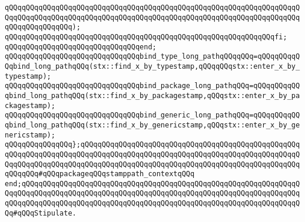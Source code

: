 \verb|qQQqqQQqqQQqqQQqqQQqqQQqqQQqqQQqqQQqqQQqqQQqqQQqqQQqqQQqqQQqqQQqqQQqqQQqqQQqqQQqqQQqqQQqqQQqqQQqqQQqqQQqqQQqqQQqqQQqqQQqqQQqqQQqqQQqqQQqqQQqqQQqqQQqqQQqqQQq);|\newline
\verb|qQQqqQQqqQQqqQQqqQQqqQQqqQQqqQQqqQQqqQQqqQQqqQQqqQQqqQQqqQQqqQQqfi;|\newline
\verb|qQQqqQQqqQQqqQQqqQQqqQQqqQQqqQQqend;|\newline
\newline
\verb|qQQqqQQqqQQqqQQqqQQqqQQqqQQqqQQqbind_type_long_pathqQQqqQQq=qQQqqQQqqQQqbind_long_pathqQQq(stx::find_x_by_typestamp,qQQqqQQqstx::enter_x_by_typestamp);|\newline
\verb|qQQqqQQqqQQqqQQqqQQqqQQqqQQqqQQqbind_package_long_pathqQQq=qQQqqQQqqQQqbind_long_pathqQQq(stx::find_x_by_packagestamp,qQQqstx::enter_x_by_packagestamp);|\newline
\verb|qQQqqQQqqQQqqQQqqQQqqQQqqQQqqQQqbind_generic_long_pathqQQq=qQQqqQQqqQQqbind_long_pathqQQq(stx::find_x_by_genericstamp,qQQqstx::enter_x_by_genericstamp);|\newline
\newline
\verb|qQQqqQQqqQQqqQQq};qQQqqQQqqQQqqQQqqQQqqQQqqQQqqQQqqQQqqQQqqQQqqQQqqQQqqQQqqQQqqQQqqQQqqQQqqQQqqQQqqQQqqQQqqQQqqQQqqQQqqQQqqQQqqQQqqQQqqQQqqQQqqQQqqQQqqQQqqQQqqQQqqQQqqQQqqQQqqQQqqQQqqQQqqQQqqQQqqQQqqQQqqQQqqQQqqQQqqQQq#qQQqpackageqQQqstamppath_contextqQQq|\newline
\verb|end;qQQqqQQqqQQqqQQqqQQqqQQqqQQqqQQqqQQqqQQqqQQqqQQqqQQqqQQqqQQqqQQqqQQqqQQqqQQqqQQqqQQqqQQqqQQqqQQqqQQqqQQqqQQqqQQqqQQqqQQqqQQqqQQqqQQqqQQqqQQqqQQqqQQqqQQqqQQqqQQqqQQqqQQqqQQqqQQqqQQqqQQqqQQqqQQqqQQqqQQqqQQqqQQq#qQQqStipulate.|\newline
\newline

